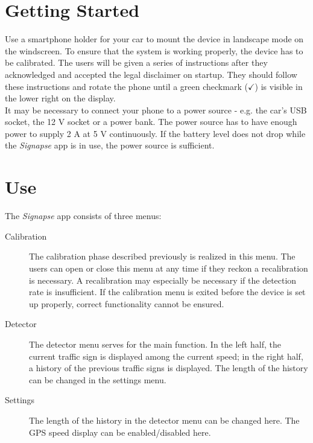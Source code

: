 \documentclass[12pt,a4paper,english,enabledeprecatedfontcommands]{article}
\begin{document}
\section{Getting Started}

Use a smartphone holder for your car to mount the device in landscape mode on the windscreen. To ensure that the system is working properly, the device has to be calibrated. The users will be given a series of instructions after they acknowledged and accepted the legal disclaimer on startup. They should follow these instructions and rotate the phone until a green checkmark ($\checkmark$) is visible in the lower right on the display. \\

It may be necessary to connect your phone to a power source - e.g. the car's USB socket, the 12 V socket or a power bank. The power source has to have enough power to supply 2 A at 5 V continuously. If the battery level does not drop while the \textit{Signapse} app is in use, the power source is sufficient.

\section{Use}
\label{sec:use}

The \textit{Signapse} app consists of three menus:

\begin{description}
    \item[Calibration] The calibration phase described previously is realized in this menu. The users can open or close this menu at any time if they reckon a recalibration is necessary. A recalibration may especially be necessary if the detection rate is insufficient. If the calibration menu is exited before the device is set up properly, correct functionality cannot be ensured.
    
    \item[Detector] The detector menu serves for the main function. In the left half, the current traffic sign is displayed among the current speed; in the right half, a history of the previous traffic signs is displayed. The length of the history can be changed in the settings menu.
    
   \item[Settings] The length of the history in the detector menu can be changed here. The GPS speed display can be enabled/disabled here.

\end{description}
\end{document}
